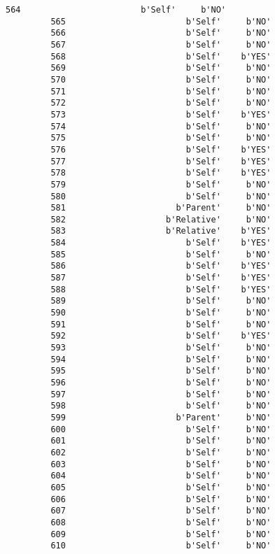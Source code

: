 \documentclass[11pt]{article}
\begin{document}
\begin{Verbatim}[commandchars=\\\{\}]
         564                        b'Self'     b'NO'  
         565                        b'Self'     b'NO'  
         566                        b'Self'     b'NO'  
         567                        b'Self'     b'NO'  
         568                        b'Self'    b'YES'  
         569                        b'Self'     b'NO'  
         570                        b'Self'     b'NO'  
         571                        b'Self'     b'NO'  
         572                        b'Self'     b'NO'  
         573                        b'Self'    b'YES'  
         574                        b'Self'     b'NO'  
         575                        b'Self'     b'NO'  
         576                        b'Self'    b'YES'  
         577                        b'Self'    b'YES'  
         578                        b'Self'    b'YES'  
         579                        b'Self'     b'NO'  
         580                        b'Self'     b'NO'  
         581                      b'Parent'     b'NO'  
         582                    b'Relative'     b'NO'  
         583                    b'Relative'    b'YES'  
         584                        b'Self'    b'YES'  
         585                        b'Self'     b'NO'  
         586                        b'Self'    b'YES'  
         587                        b'Self'    b'YES'  
         588                        b'Self'    b'YES'  
         589                        b'Self'     b'NO'  
         590                        b'Self'     b'NO'  
         591                        b'Self'     b'NO'  
         592                        b'Self'    b'YES'  
         593                        b'Self'     b'NO'  
         594                        b'Self'     b'NO'  
         595                        b'Self'     b'NO'  
         596                        b'Self'     b'NO'  
         597                        b'Self'     b'NO'  
         598                        b'Self'     b'NO'  
         599                      b'Parent'     b'NO'  
         600                        b'Self'     b'NO'  
         601                        b'Self'     b'NO'  
         602                        b'Self'     b'NO'  
         603                        b'Self'     b'NO'  
         604                        b'Self'     b'NO'  
         605                        b'Self'     b'NO'  
         606                        b'Self'     b'NO'  
         607                        b'Self'     b'NO'  
         608                        b'Self'     b'NO'  
         609                        b'Self'     b'NO'  
         610                        b'Self'     b'NO'  

\end{Verbatim}
\end{document}
